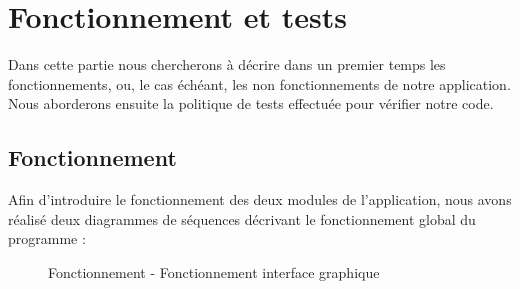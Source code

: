 \chapter{Fonctionnement et tests}

Dans cette partie nous chercherons à décrire dans un premier temps les fonctionnements, ou, le cas échéant, les non fonctionnements de notre application.  Nous aborderons ensuite la politique de tests effectuée pour vérifier notre code. 

\section{Fonctionnement}

Afin d'introduire le fonctionnement des deux modules de l'application, nous avons réalisé deux diagrammes de séquences décrivant le fonctionnement global du programme :

\begin{figure}[!ht]
\begin{center}
  \caption{Fonctionnement - Fonctionnement interface graphique}
  \label{sequence} 
\end{center}
\end{figure}

